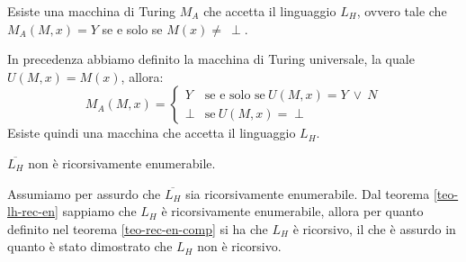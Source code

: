\begin{dimostrazione}
    Esiste una macchina di Turing $M_A$ che accetta il linguaggio $L_H$, ovvero
    tale che $M_A(M, x) = Y$ se e solo se $M(x) \neq \ \perp$.

    In precedenza abbiamo definito la macchina di Turing universale, la quale
    $U(M, x) = M(x)$, allora:
    \begin{equation}
        M_A(M, x) = \begin{cases}
            Y     & \text{se e solo se} \ U(M, x) = Y \ \lor \ N \\
            \perp & \text{se} \ U(M, x) = \perp
        \end{cases}
    \end{equation}
    Esiste quindi una macchina che accetta il linguaggio $L_H$.
\end{dimostrazione}
\begin{teorema}
    $\overline{L_H}$ non è ricorsivamente enumerabile.
\end{teorema}
\begin{dimostrazione} 
    Assumiamo per assurdo che $\overline{L_H}$ sia ricorsivamente enumerabile.
    Dal teorema \ref{teo-lh-rec-en} sappiamo che $L_H$ è ricorsivamente
    enumerabile, allora per quanto definito nel teorema \ref{teo-rec-en-comp} si
    ha che $L_H$ è ricorsivo, il che è assurdo in quanto è stato dimostrato che
    $L_H$ non è ricorsivo.
\end{dimostrazione}
